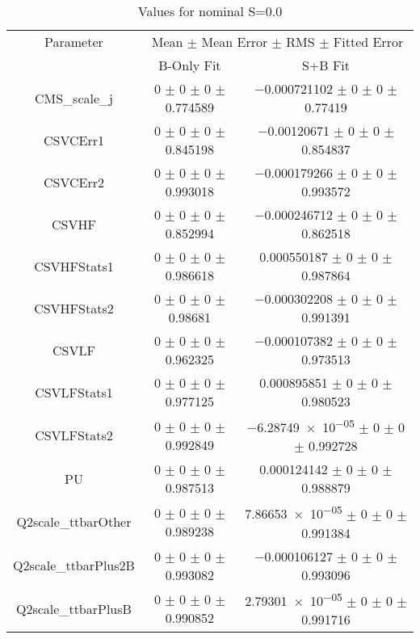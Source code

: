 \begin{table}
\centering
\caption{Values for nominal S=0.0}
\begin{tabular}{ccc}
\toprule
Parameter & \multicolumn{2}{c}{Mean $\pm$ Mean Error $\pm$ RMS $\pm$ Fitted Error}\\
 & B-Only Fit & S+B Fit\\
\midrule
CMS\_scale\_j & \num{0} $\pm$ \num{0} $\pm$ \num{0} $\pm$ \num{0.774589} & \num{-0.000721102} $\pm$ \num{0} $\pm$ \num{0} $\pm$ \num{0.77419}\\
CSVCErr1 & \num{0} $\pm$ \num{0} $\pm$ \num{0} $\pm$ \num{0.845198} & \num{-0.00120671} $\pm$ \num{0} $\pm$ \num{0} $\pm$ \num{0.854837}\\
CSVCErr2 & \num{0} $\pm$ \num{0} $\pm$ \num{0} $\pm$ \num{0.993018} & \num{-0.000179266} $\pm$ \num{0} $\pm$ \num{0} $\pm$ \num{0.993572}\\
CSVHF & \num{0} $\pm$ \num{0} $\pm$ \num{0} $\pm$ \num{0.852994} & \num{-0.000246712} $\pm$ \num{0} $\pm$ \num{0} $\pm$ \num{0.862518}\\
CSVHFStats1 & \num{0} $\pm$ \num{0} $\pm$ \num{0} $\pm$ \num{0.986618} & \num{0.000550187} $\pm$ \num{0} $\pm$ \num{0} $\pm$ \num{0.987864}\\
CSVHFStats2 & \num{0} $\pm$ \num{0} $\pm$ \num{0} $\pm$ \num{0.98681} & \num{-0.000302208} $\pm$ \num{0} $\pm$ \num{0} $\pm$ \num{0.991391}\\
CSVLF & \num{0} $\pm$ \num{0} $\pm$ \num{0} $\pm$ \num{0.962325} & \num{-0.000107382} $\pm$ \num{0} $\pm$ \num{0} $\pm$ \num{0.973513}\\
CSVLFStats1 & \num{0} $\pm$ \num{0} $\pm$ \num{0} $\pm$ \num{0.977125} & \num{0.000895851} $\pm$ \num{0} $\pm$ \num{0} $\pm$ \num{0.980523}\\
CSVLFStats2 & \num{0} $\pm$ \num{0} $\pm$ \num{0} $\pm$ \num{0.992849} & \num{-6.28749e-05} $\pm$ \num{0} $\pm$ \num{0} $\pm$ \num{0.992728}\\
PU & \num{0} $\pm$ \num{0} $\pm$ \num{0} $\pm$ \num{0.987513} & \num{0.000124142} $\pm$ \num{0} $\pm$ \num{0} $\pm$ \num{0.988879}\\
Q2scale\_ttbarOther & \num{0} $\pm$ \num{0} $\pm$ \num{0} $\pm$ \num{0.989238} & \num{7.86653e-05} $\pm$ \num{0} $\pm$ \num{0} $\pm$ \num{0.991384}\\
Q2scale\_ttbarPlus2B & \num{0} $\pm$ \num{0} $\pm$ \num{0} $\pm$ \num{0.993082} & \num{-0.000106127} $\pm$ \num{0} $\pm$ \num{0} $\pm$ \num{0.993096}\\
Q2scale\_ttbarPlusB & \num{0} $\pm$ \num{0} $\pm$ \num{0} $\pm$ \num{0.990852} & \num{2.79301e-05} $\pm$ \num{0} $\pm$ \num{0} $\pm$ \num{0.991716}\\

\end{tabular}
\end{table}

